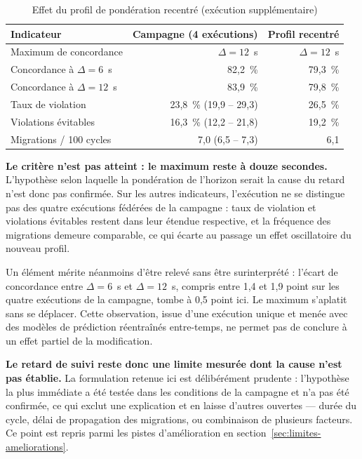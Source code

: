 \begin{table}[H]
    \centering
    \caption{Effet du profil de pondération recentré (exécution supplémentaire)}
    \label{tab:run9-horizon}
    \begin{tabular}{lrr}
        \toprule
        \textbf{Indicateur} & \textbf{Campagne (4 exécutions)} & \textbf{Profil recentré} \\
        \midrule
        Maximum de concordance & $\Delta = 12$~s & $\Delta = 12$~s \\
        Concordance à $\Delta = 6$~s & 82,2~\% & 79,3~\% \\
        Concordance à $\Delta = 12$~s & 83,9~\% & 79,8~\% \\
        \addlinespace
        Taux de violation & 23,8~\% (19,9 -- 29,3) & 26,5~\% \\
        Violations évitables & 16,3~\% (12,2 -- 21,8) & 19,2~\% \\
        Migrations / 100 cycles & 7,0 (6,5 -- 7,3) & 6,1 \\
        \bottomrule
    \end{tabular}
\end{table}

\textbf{Le critère n'est pas atteint : le maximum reste à douze secondes.} L'hypothèse selon laquelle la pondération de l'horizon serait la cause du retard n'est donc pas confirmée. Sur les autres indicateurs, l'exécution ne se distingue pas des quatre exécutions fédérées de la campagne : taux de violation et violations évitables restent dans leur étendue respective, et la fréquence des migrations demeure comparable, ce qui écarte au passage un effet oscillatoire du nouveau profil.

Un élément mérite néanmoins d'être relevé sans être surinterprété : l'écart de concordance entre $\Delta = 6$~s et $\Delta = 12$~s, compris entre 1,4 et 1,9 point sur les quatre exécutions de la campagne, tombe à 0,5 point ici. Le maximum s'aplatit sans se déplacer. Cette observation, issue d'une exécution unique et menée avec des modèles de prédiction réentraînés entre-temps, ne permet pas de conclure à un effet partiel de la modification.

\textbf{Le retard de suivi reste donc une limite mesurée dont la cause n'est pas établie.} La formulation retenue ici est délibérément prudente : l'hypothèse la plus immédiate a été testée dans les conditions de la campagne et n'a pas été confirmée, ce qui exclut une explication et en laisse d'autres ouvertes — durée du cycle, délai de propagation des migrations, ou combinaison de plusieurs facteurs. Ce point est repris parmi les pistes d'amélioration en section~\ref{sec:limites-ameliorations}.

